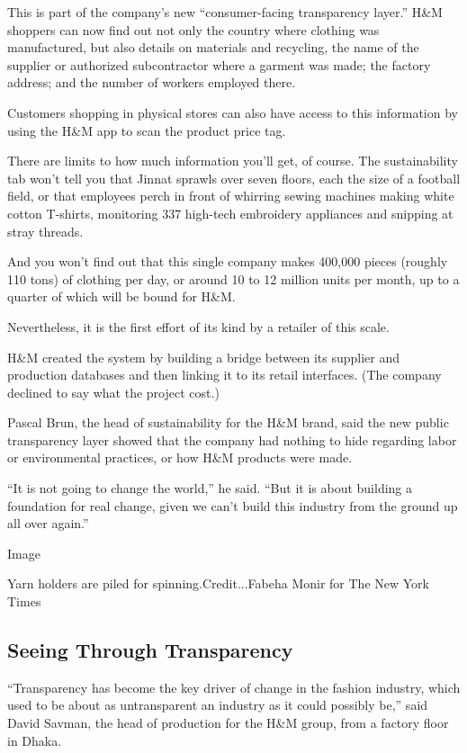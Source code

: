 This is part of the company's new ``consumer-facing transparency
layer.'' H\&M shoppers can now find out not only the country where
clothing was manufactured, but also details on materials and recycling,
the name of the supplier or authorized subcontractor where a garment was
made; the factory address; and the number of workers employed there.

Customers shopping in physical stores can also have access to this
information by using the H\&M app to scan the product price tag.

There are limits to how much information you'll get, of course. The
sustainability tab won't tell you that Jinnat sprawls over seven floors,
each the size of a football field, or that employees perch in front of
whirring sewing machines making white cotton T-shirts, monitoring 337
high-tech embroidery appliances and snipping at stray threads.

And you won't find out that this single company makes 400,000 pieces
(roughly 110 tons) of clothing per day, or around 10 to 12 million units
per month, up to a quarter of which will be bound for H\&M.

Nevertheless, it is the first effort of its kind by a retailer of this
scale.

H\&M created the system by building a bridge between its supplier and
production databases and then linking it to its retail interfaces. (The
company declined to say what the project cost.)

Pascal Brun, the head of sustainability for the H\&M brand, said the new
public transparency layer showed that the company had nothing to hide
regarding labor or environmental practices, or how H\&M products were
made.

``It is not going to change the world,'' he said. ``But it is about
building a foundation for real change, given we can't build this
industry from the ground up all over again.''

Image

Yarn holders are piled for spinning.Credit...Fabeha Monir for The New
York Times

\hypertarget{seeing-through-transparency}{%
\subsection{Seeing Through
Transparency}\label{seeing-through-transparency}}

``Transparency has become the key driver of change in the fashion
industry, which used to be about as untransparent an industry as it
could possibly be,'' said David Savman, the head of production for the
H\&M group, from a factory floor in Dhaka.

